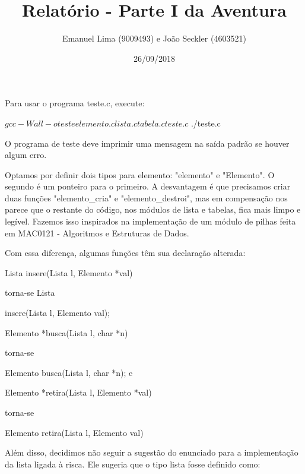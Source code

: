 \documentclass{article}
\title{Relatório - Parte I da Aventura}
\date{26/09/2018}
\author{Emanuel Lima (9009493) e João Seckler (4603521)}
\begin{document}
\maketitle

Para usar o programa teste.c, execute:

\begin{spverbatim}
$ gcc -Wall -o teste elemento.c lista.c tabela.c teste.c
$ ./teste.c
\end{spverbatim}
  
\medskip

O programa de teste deve imprimir uma mensagem na saída padrão se houver algum  erro.

Optamos por definir dois tipos para elemento: "elemento" e "Elemento". O segundo é um ponteiro para o primeiro. A desvantagem é que precisamos criar duas funções "elemento\_cria" e "elemento\_destroi", mas em compensação nos parece que o restante do código, nos módulos de lista e tabelas, fica mais limpo e legível. Fazemos isso inspirados na implementação de um módulo de pilhas feita em MAC0121 - Algoritmos e Estruturas de Dados.

Com essa diferença, algumas funções têm sua declaração alterada:

\begin{spverbatim}
  Lista insere(Lista l, Elemento *val)
\end{spverbatim} \medskip
torna-se Lista
\begin{spverbatim}
  insere(Lista l, Elemento val);
\end{spverbatim} \medskip

\begin{spverbatim}
  Elemento *busca(Lista l, char *n)
\end{spverbatim} \medskip
torna-se
\begin{spverbatim}
  Elemento busca(Lista l, char *n); e
\end{spverbatim} \medskip

\begin{spverbatim}
  Elemento *retira(Lista l, Elemento *val)
\end{spverbatim} \medskip
torna-se
\begin{spverbatim}
  Elemento retira(Lista l, Elemento val)
\end{spverbatim} \medskip

Além disso, decidimos não seguir a sugestão do enunciado para a implementação da lista ligada à risca. Ele sugeria que o tipo lista fosse definido como:
\end{document}
